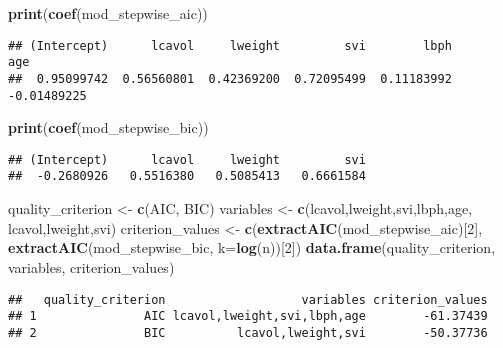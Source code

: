 \documentclass[
]{article}
\newenvironment{Shaded}{\begin{snugshade}}{\end{snugshade}}
\newcommand{\AttributeTok}[1]{\textcolor[rgb]{0.13,0.29,0.53}{#1}}
\newcommand{\DecValTok}[1]{\textcolor[rgb]{0.00,0.00,0.81}{#1}}
\newcommand{\FunctionTok}[1]{\textcolor[rgb]{0.13,0.29,0.53}{\textbf{#1}}}
\newcommand{\NormalTok}[1]{#1}
\newcommand{\OtherTok}[1]{\textcolor[rgb]{0.56,0.35,0.01}{#1}}
\newcommand{\StringTok}[1]{\textcolor[rgb]{0.31,0.60,0.02}{#1}}
\begin{document}
\begin{enumerate}
\begin{Shaded}
\begin{Highlighting}[]
\FunctionTok{print}\NormalTok{(}\FunctionTok{coef}\NormalTok{(mod\_stepwise\_aic))}
\end{Highlighting}
\end{Shaded}

\begin{verbatim}
## (Intercept)      lcavol     lweight         svi        lbph         age 
##  0.95099742  0.56560801  0.42369200  0.72095499  0.11183992 -0.01489225
\end{verbatim}

\begin{Shaded}
\begin{Highlighting}[]
\FunctionTok{print}\NormalTok{(}\FunctionTok{coef}\NormalTok{(mod\_stepwise\_bic))}
\end{Highlighting}
\end{Shaded}

\begin{verbatim}
## (Intercept)      lcavol     lweight         svi 
##  -0.2680926   0.5516380   0.5085413   0.6661584
\end{verbatim}

\begin{Shaded}
\begin{Highlighting}[]
\NormalTok{quality\_criterion }\OtherTok{\textless{}{-}} \FunctionTok{c}\NormalTok{(}\StringTok{\textquotesingle{}AIC\textquotesingle{}}\NormalTok{, }\StringTok{\textquotesingle{}BIC\textquotesingle{}}\NormalTok{)}
\NormalTok{variables }\OtherTok{\textless{}{-}} \FunctionTok{c}\NormalTok{(}\StringTok{\textquotesingle{}lcavol,lweight,svi,lbph,age\textquotesingle{}}\NormalTok{, }\StringTok{\textquotesingle{}lcavol,lweight,svi\textquotesingle{}}\NormalTok{)}
\NormalTok{criterion\_values }\OtherTok{\textless{}{-}} \FunctionTok{c}\NormalTok{(}\FunctionTok{extractAIC}\NormalTok{(mod\_stepwise\_aic)[}\DecValTok{2}\NormalTok{], }\FunctionTok{extractAIC}\NormalTok{(mod\_stepwise\_bic, }\AttributeTok{k=}\FunctionTok{log}\NormalTok{(n))[}\DecValTok{2}\NormalTok{])}
\FunctionTok{data.frame}\NormalTok{(quality\_criterion, variables, criterion\_values)}
\end{Highlighting}
\end{Shaded}

\begin{verbatim}
##   quality_criterion                   variables criterion_values
## 1               AIC lcavol,lweight,svi,lbph,age        -61.37439
## 2               BIC          lcavol,lweight,svi        -50.37736
\end{verbatim}


\end{enumerate}
\end{document}
